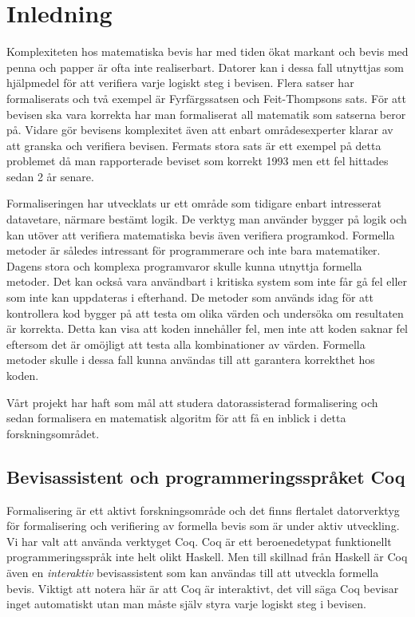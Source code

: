 \section{Inledning}
Komplexiteten hos matematiska bevis har med tiden ökat markant och bevis med
penna och papper är ofta inte realiserbart. Datorer kan i dessa fall utnyttjas
som hjälpmedel för att verifiera varje logiskt steg i bevisen. Flera satser har
formaliserats och två exempel är Fyrfärgssatsen\cite{gonthier2008formal} och
Feit-Thompsons sats\cite{something}. För att bevisen ska vara korrekta har man
formaliserat all matematik som satserna beror på. Vidare gör bevisens
komplexitet även att enbart områdesexperter klarar av att granska och verifiera
bevisen. Fermats stora sats är ett exempel på detta problemet då man
rapporterade beviset som korrekt 1993 men ett fel hittades sedan 2 år
senare\cite{something}.

Formaliseringen har utvecklats ur ett område som tidigare enbart intresserat
datavetare, närmare bestämt logik. De verktyg man använder bygger på logik och
kan utöver att verifiera matematiska bevis även verifiera programkod. Formella
metoder är således intressant för programmerare och inte bara matematiker.
Dagens stora och komplexa programvaror skulle kunna utnyttja formella metoder.
Det kan också vara användbart i kritiska system som inte får gå fel eller som
inte kan uppdateras i efterhand. De metoder som används idag för att
kontrollera kod bygger på att testa om olika värden och undersöka om resultaten
är korrekta. Detta kan visa att koden innehåller fel, men inte att koden saknar
fel eftersom det är omöjligt att testa alla kombinationer av värden. Formella
metoder skulle i dessa fall kunna användas till att garantera korrekthet hos
koden.

Vårt projekt har haft som mål att studera datorassisterad formalisering och
sedan formalisera en matematisk algoritm för att få en inblick i detta
forskningsområdet.

\subsection{Bevisassistent och programmeringsspråket Coq}
Formalisering är ett aktivt forskningsområde och det finns flertalet
datorverktyg för formalisering och verifiering av formella bevis som är under
aktiv utveckling. Vi har valt att använda verktyget Coq. Coq är ett
beroenedetypat funktionellt programmeringsspråk inte helt olikt Haskell. Men
till skillnad från Haskell är Coq även en \emph{interaktiv} bevisassistent som
kan användas till att utveckla formella bevis. Viktigt att notera här är att
Coq är interaktivt, det vill säga Coq bevisar inget automatiskt utan man måste
själv styra varje logiskt steg i bevisen.

